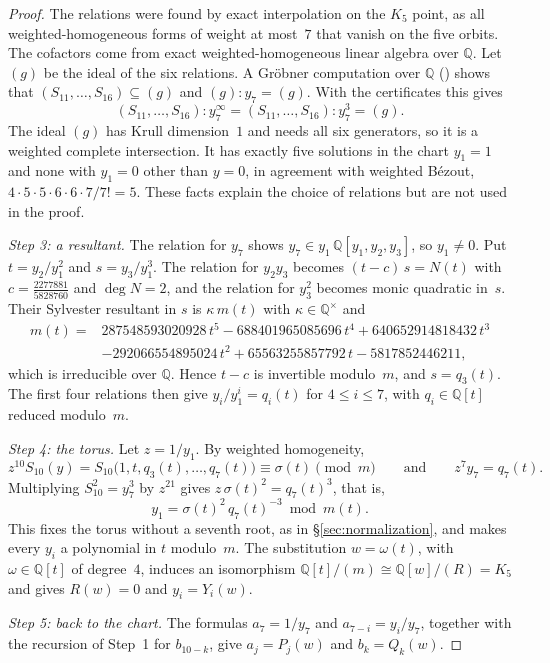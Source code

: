 \documentclass[a4paper,11pt]{article}
\newcommand{\filename}[1]{\texttt{\seqsplit{#1}}}
\theoremstyle{plain}
\theoremstyle{definition}
\theoremstyle{remark}
\begin{document}
\begin{proof}
The relations were found by exact interpolation on the $K_5$ point, as all weighted-homogeneous forms of weight at most~$7$ that vanish on the five orbits. The cofactors come from exact weighted-homogeneous linear algebra over $\mathbb{Q}$. Let $(g)$ be the ideal of the six relations. A Gr\"obner computation over $\mathbb{Q}$ (\filename{saturation\_check.py}) shows that $(S_{11},\dots,S_{16})\subseteq(g)$ and $(g):y_7=(g)$. With the certificates this gives
\[
(S_{11},\dots,S_{16}):y_7^\infty=(S_{11},\dots,S_{16}):y_7^3=(g).
\]
The ideal $(g)$ has Krull dimension~$1$ and needs all six generators, so it is a weighted complete intersection. It has exactly five solutions in the chart $y_1=1$ and none with $y_1=0$ other than $y=0$, in agreement with weighted B\'ezout, $4\cdot5\cdot5\cdot6\cdot6\cdot7/7!=5$. These facts explain the choice of relations but are not used in the proof.

\emph{Step 3: a resultant.} The relation for $y_7$ shows $y_7\in y_1\,\mathbb{Q}[y_1,y_2,y_3]$, so $y_1\neq0$. Put $t=y_2/y_1^2$ and $s=y_3/y_1^3$. The relation for $y_2y_3$ becomes $(t-c)\,s=N(t)$ with $c=\tfrac{2277881}{5828760}$ and $\deg N=2$, and the relation for $y_3^2$ becomes monic quadratic in~$s$. Their Sylvester resultant in $s$ is $\kappa\,m(t)$ with $\kappa\in\mathbb{Q}^\times$ and
\[
\begin{aligned}
m(t)={}&287548593020928\,t^5-688401965085696\,t^4+640652914818432\,t^3\\
&-292066554895024\,t^2+65563255857792\,t-5817852446211,
\end{aligned}
\]
which is irreducible over $\mathbb{Q}$. Hence $t-c$ is invertible modulo~$m$, and $s=q_3(t)$. The first four relations then give $y_i/y_1^i=q_i(t)$ for $4\le i\le 7$, with $q_i\in\mathbb{Q}[t]$ reduced modulo~$m$.

\emph{Step 4: the torus.} Let $z=1/y_1$. By weighted homogeneity,
\[
z^{10}S_{10}(y)=S_{10}\bigl(1,t,q_3(t),\dots,q_7(t)\bigr)\equiv\sigma(t)\pmod m\qquad\text{and}\qquad z^7y_7=q_7(t).
\] Multiplying $S_{10}^2=y_7^3$ by $z^{21}$ gives $z\,\sigma(t)^2=q_7(t)^3$, that is,
\[
y_1=\sigma(t)^2\,q_7(t)^{-3}\bmod m(t).
\]
This fixes the torus without a seventh root, as in \S\ref{sec:normalization}, and makes every $y_i$ a polynomial in $t$ modulo~$m$. The substitution $w=\omega(t)$, with $\omega\in\mathbb{Q}[t]$ of degree~$4$, induces an isomorphism $\mathbb{Q}[t]/(m)\cong\mathbb{Q}[w]/(R)=K_5$ and gives $R(w)=0$ and $y_i=Y_i(w)$.

\emph{Step 5: back to the chart.} The formulas $a_7=1/y_7$ and $a_{7-i}=y_i/y_7$, together with the recursion of Step~1 for $b_{10-k}$, give $a_j=P_j(w)$ and $b_k=Q_k(w)$.
\end{proof}
\end{document}
